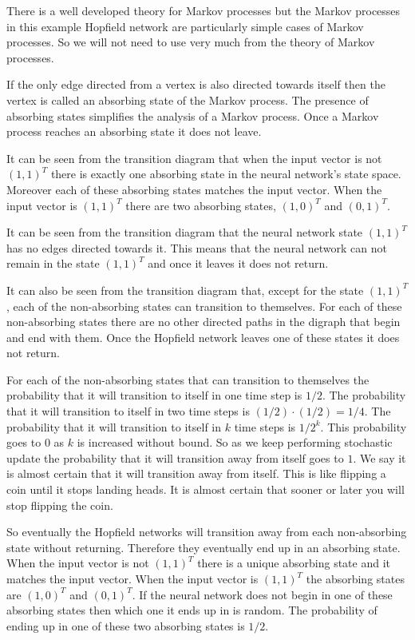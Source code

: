    There is a well developed theory for Markov processes but the Markov
processes in this example Hopfield network are particularly simple cases of 
Markov processes.  So we will not need to use very much from the theory of 
Markov processes.

   If the only edge directed from a vertex is also directed towards itself then
the vertex is called an absorbing state of the Markov process.  The presence of
absorbing states simplifies the analysis of a Markov process.  Once a Markov 
process reaches an absorbing state it does not leave.  

   It can be seen from the transition diagram that when the input vector is not 
$(1,1)^T$ there is exactly one absorbing state in the neural network's state 
space.  Moreover each of these absorbing states matches the input vector.  When 
the input vector is $(1,1)^T$ there are two absorbing states, $(1,0)^T$ and 
$(0,1)^T$.

   It can be seen from the transition diagram that the neural network state 
$(1,1)^T$ has no edges directed towards it.  This means that the neural 
network can not remain in the state $(1,1)^T$ and once it leaves it does not 
return.

  It can also be seen from the transition diagram that, except for the state
$(1,1)^T$, each of the non-absorbing states can transition to themselves.  For 
each of these non-absorbing states there are no other directed paths in the 
digraph that begin and end with them.  Once the Hopfield network leaves one of these states it does not return.

   For each of the non-absorbing states that can transition to themselves the
probability that it will transition to itself in one time step is $1/2$.  The
probability that it will transition to itself in two time steps is $(1/2) \cdot
(1/2) = 1/4$.  The probability that it will transition to itself in $k$ time 
steps is $1/2^k$.  This probability goes to $0$ as $k$ is increased without
bound.  So as we keep performing stochastic update the probability that it
will transition away from itself goes to $1$.  We say it is almost certain that
it will transition away from itself.  This is like flipping a coin until it
stops landing heads.  It is almost certain that sooner or later you will stop 
flipping the coin.

   So eventually the Hopfield networks will transition away from each 
non-absorbing state without returning.  Therefore they eventually end up in an 
absorbing state.  When the input vector is not $(1,1)^T$ there is a unique 
absorbing state and it matches the input vector.  When the input vector is 
$(1,1)^T$ the absorbing states are $(1,0)^T$ and $(0,1)^T$.  If the neural 
network does not begin in one of these absorbing states then which one it ends 
up in is random.  The probability of ending up in one of these two absorbing 
states is $1/2$.

